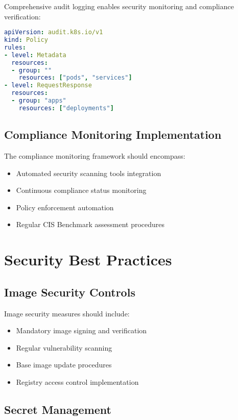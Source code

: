 \documentclass[PMO,lsstdraft,authoryear,toc]{lsstdoc}
\begin{document}
Comprehensive audit logging enables security monitoring and compliance verification:

\begin{lstlisting}[language=yaml]
apiVersion: audit.k8s.io/v1
kind: Policy
rules:
- level: Metadata
  resources:
  - group: ""
    resources: ["pods", "services"]
- level: RequestResponse
  resources:
  - group: "apps"
    resources: ["deployments"]
\end{lstlisting}

\subsection{Compliance Monitoring Implementation}

The compliance monitoring framework should encompass:

\begin{itemize}
    \item Automated security scanning tools integration
    \item Continuous compliance status monitoring
    \item Policy enforcement automation
    \item Regular CIS Benchmark assessment procedures
\end{itemize}

\section{Security Best Practices}

\subsection{Image Security Controls}

Image security measures should include:

\begin{itemize}
    \item Mandatory image signing and verification
    \item Regular vulnerability scanning
    \item Base image update procedures
    \item Registry access control implementation
\end{itemize}

\subsection{Secret Management}
\end{document}
